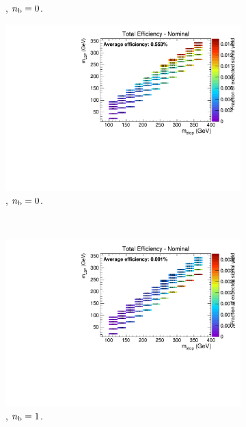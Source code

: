 \begin{figure}[ht!]
\begin{subfigure}[b]{0.32\textwidth}
    \caption{\njlow, $n_{\text{b}} = 0$.}
  \end{subfigure}
  \begin{subfigure}[b]{0.32\textwidth}
    \includegraphics[width=\textwidth, page=6]{Figs/sms/t2cc/v24/JES_T2cc_v24_eq0b_le3j_incl.pdf}
    \caption{\njlow, $n_{\text{b}} = 0$.}
    \label{fig:sms-jes-t2cc-le3j-0b}
  \end{subfigure}\\
  \begin{subfigure}[b]{0.32\textwidth}
    \includegraphics[width=\textwidth, page=4]{Figs/sms/t2cc/v24/JES_T2cc_v24_eq1b_le3j_incl.pdf}
    \caption{\njlow, $n_{\text{b}} = 1$.}
  \end{subfigure}
  \begin{subfigure}[b]{0.32\textwidth}

\end{subfigure}
\end{figure}

